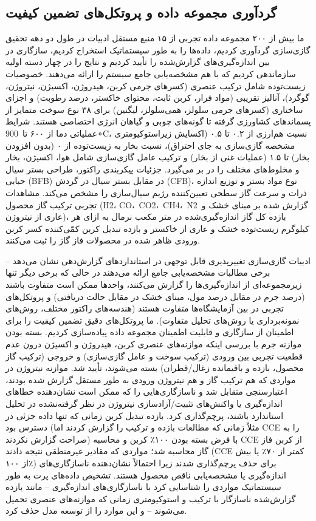 \documentclass[12pt, a4paper]{article}
\begin{document}
\subsection{گردآوری مجموعه داده و پروتکل‌های تضمین کیفیت}

ما بیش از ۲۰۰ مجموعه داده تجربی از ۱۵ منبع مستقل ادبیات در طول دو دهه تحقیق گازی‌سازی گردآوری کردیم، داده‌ها را به طور سیستماتیک استخراج کردیم، سازگاری در بین اندازه‌گیری‌های گزارش‌شده را تأیید کردیم و نتایج را در چهار دسته اولیه سازماندهی کردیم که با هم مشخصه‌یابی جامع سیستم را ارائه می‌دهند. خصوصیات زیست‌توده شامل ترکیب عنصری (کسرهای جرمی کربن، هیدروژن، اکسیژن، نیتروژن، گوگرد)، آنالیز تقریبی (مواد فرار، کربن ثابت، محتوای خاکستر، درصد رطوبت) و اجزای ساختاری (کسرهای جرمی سلولز، همی‌سلولز، لیگنین) برای ۳۸ نوع سوخت متمایز از پسماندهای کشاورزی گرفته تا گونه‌های چوبی و گیاهان انرژی اختصاصی هستند. شرایط عملیاتی دما از ۶۰۰ تا 900∘C، نسبت هم‌ارزی از ۰.۲ تا ۰.۵ (اکسایش زیراستوکیومتری مشخصه گازی‌سازی به جای احتراق)، نسبت بخار به زیست‌توده از ۰ (بدون افزودن بخار) تا ۱.۵ (عملیات غنی از بخار) و ترکیب عامل گازی‌سازی شامل هوا، اکسیژن، بخار و مخلوط‌های مختلف را در بر می‌گیرد. جزئیات پیکربندی راکتور، طراحی بستر سیال حبابی (BFB) در مقابل بستر سیال در گردش (CFB)، نوع مواد بستر و توزیع اندازه ذرات و سرعت گاز سطحی تعیین‌کننده رژیم سیال‌سازی را مشخص می‌کند. مشاهدات تجربی ترکیب گاز محصول (H2، CO، CO2، CH4، N2 گزارش شده بر مبنای خشک و عاری از نیتروژن)، بازده کل گاز اندازه‌گیری‌شده در متر مکعب نرمال به ازای هر کیلوگرم زیست‌توده خشک و عاری از خاکستر و بازده تبدیل کربن کمّی‌کننده کسر کربن ورودی ظاهر شده در محصولات فاز گاز را ثبت می‌کنند.

ادبیات گازی‌سازی تغییرپذیری قابل توجهی در استانداردهای گزارش‌دهی نشان می‌دهد – برخی مطالبات مشخصه‌یابی جامع ارائه می‌دهند در حالی که برخی دیگر تنها زیرمجموعه‌ای از اندازه‌گیری‌ها را گزارش می‌کنند، واحدها ممکن است متفاوت باشند (درصد جرم در مقابل درصد مول، مبنای خشک در مقابل حالت دریافتی) و پروتکل‌های تجربی در بین آزمایشگاه‌ها متفاوت هستند (هندسه‌های راکتور مختلف، روش‌های نمونه‌برداری یا روش‌های تحلیل متفاوت). ما پروتکل‌های دقیق تضمین کیفیت را برای اطمینان از سازگاری و قابلیت اطمینان مجموعه داده پیاده‌سازی کردیم. بسته بودن موازنه جرم با بررسی اینکه موازنه‌های عنصری کربن، هیدروژن و اکسیژن درون عدم قطعیت تجربی بین ورودی (ترکیب سوخت و عامل گازی‌سازی) و خروجی (ترکیب گاز محصول، بازده و باقیمانده زغال/قطران) بسته می‌شوند، تأیید شد. موازنه نیتروژن در مواردی که هم ترکیب گاز و هم نیتروژن ورودی به طور مستقل گزارش شده بودند، اعتبارسنجی متقابل شد و ناسازگاری‌هایی را که ممکن است نشان‌دهنده خطاهای اندازه‌گیری یا واکنش‌های تثبیت/آزادسازی نیتروژن در نظر گرفته‌نشده در تحلیل استاندارد باشند، پرچم‌گذاری کرد. بازده تبدیل کربن زمانی که تنها داده جزئی در دسترس بود (مثلاً زمانی که مطالعات بازده و ترکیب را گزارش کردند اما CCE را به صراحت گزارش نکردند) با فرض بسته بودن ۱۰۰٪ کربن و محاسبه CCE از کربن فاز گاز محاسبه شد؛ مواردی که مقادیر غیرمنطقی نتیجه دادند (CCE کمتر از ۷۰٪ یا بیش از ۱۰۰٪) برای حذف پرچم‌گذاری شدند زیرا احتمالاً نشان‌دهنده ناسازگاری‌های اندازه‌گیری یا مشخصه‌یابی ناقص محصول هستند. تشخیص داده‌های پرت به طور سیستماتیک مواردی را شناسایی کرد با ناسازگاری‌های اندازه‌گیری – مانند بازده گزارش‌شده ناسازگار با ترکیب و استوکیومتری زمانی که موازنه‌های عنصری تحمیل می‌شوند – و این موارد را از توسعه مدل حذف کرد.
\end{document}
